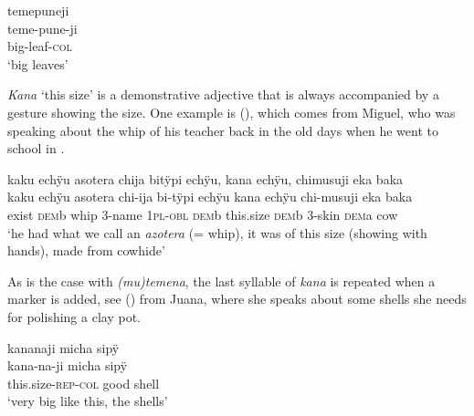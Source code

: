 \ea\label{ex:ADJ-big-3}
\begingl
\glpreamble temepuneji\\
\gla teme-pune-ji\\
\glb big-leaf-\textsc{col}\\
\glft ‘big leaves’
\endgl
\trailingcitation{[jxx-e081025s-1.183]}
\xe

 \textit{Kana} ‘this size’ is a demonstrative adjective that is always accompanied by a gesture showing the size. One example is (), which comes from Miguel, who was speaking about the whip of his teacher back in the old days when he went to school in .
 
 \ea\label{ex:big-whip}
\begingl
\glpreamble kaku echÿu asotera chija bitÿpi echÿu, kana echÿu, chimusuji eka baka\\
\gla kaku echÿu asotera chi-ija bi-tÿpi echÿu kana echÿu chi-musuji eka baka\\
\glb exist \textsc{dem}b whip 3-name 1\textsc{pl}-\textsc{obl} \textsc{dem}b this.size \textsc{dem}b 3-skin \textsc{dem}a cow\\
\glft ‘he had what we call an \textit{azotera} (= whip), it was of this size (showing with hands), made from cowhide’
\endgl
\trailingcitation{[mxx-p181027l-1.056-057]}
\xe
 
As is the case with \textit{(mu)temena}, the last syllable of \textit{kana} is repeated when a  marker is added, see () from Juana, where she speaks about some shells she needs for polishing a clay pot.

\ea\label{ex:ADJ-kana-1}
\begingl
\glpreamble kananaji micha sipÿ\\
\gla kana-na-ji micha sipÿ\\
\glb this.size-\textsc{rep}-\textsc{col} good shell\\
\glft ‘very big like this, the shells’
\endgl
\trailingcitation{[jmx-d110918ls-1.105]}
\xe{}

